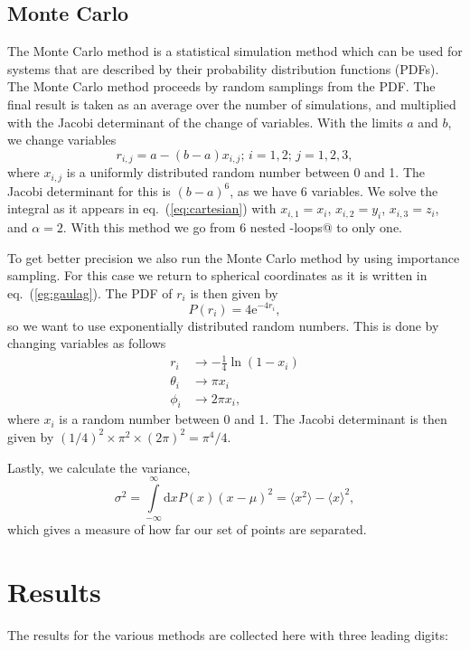 \documentclass{article}
\begin{document}
\begin{multicols}{2}
\subsection{Monte Carlo}
The Monte Carlo method is a statistical simulation method which can be used for systems that are described by their probability distribution functions (PDFs). The Monte Carlo method proceeds by random samplings from the PDF. The final result is taken as an average over the number of simulations, and multiplied with the Jacobi determinant of the change of variables. With the limits $a$ and $b$, we change variables 
\begin{equation}
	r_{i,j} = a - (b-a)x_{i,j};\,i=1,2;\,j=1,2,3,
\end{equation}
where $x_{i,j}$ is a uniformly distributed random number between 0 and 1.
The Jacobi determinant for this is $(b-a)^6$, as we have 6 variables.
We solve the integral as it appears in eq.~(\ref{eq:cartesian}) with $x_{i,1} = x_i$, $x_{i,2} = y_i$, $x_{i,3} = z_i$, and $\alpha=2$. With this method we go from 6 nested \verb@for-loops@ to only one.

To get better precision we also run the Monte Carlo method by using importance sampling. For this case we return to spherical coordinates as it is written in eq.~(\ref{eg:gaulag}). The PDF of $r_i$ is then given by
\begin{equation}
	P(r_i)=4\mathrm{e}^{-4r_i},
\end{equation}
so we want to use exponentially distributed random numbers. This is done by changing variables as follows
\begin{align*}
	r_i &\rightarrow -\frac{1}{4}\ln(1-x_i) \\
	\theta_i &\rightarrow \pi x_i \\
	\phi_i &\rightarrow 2\pi x_i,
\end{align*}
where $x_i$ is a random number between 0 and 1.
The Jacobi determinant is then given by $(1/4)^2\times\pi^2\times(2\pi)^2 = \pi^4/4$.


Lastly, we calculate the variance, 
\begin{equation}\label{eq:variance}
	\sigma^2 = \int\limits_{-\infty}^{\infty}\mathrm{d}xP(x)(x-\mu)^2 = \langle x^2\rangle-\langle x\rangle^2,
\end{equation}
which gives a measure of how far our set of points are separated.


\section{Results}
The results for the various methods are collected here with three leading digits:


\end{multicols}
\end{document}
